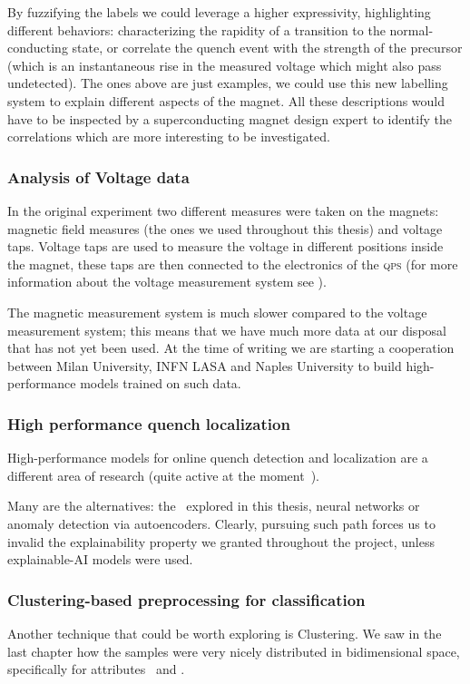 By fuzzifying the labels we could leverage a higher expressivity, highlighting different
behaviors: characterizing the rapidity of a transition to the normal-conducting state, or correlate
the quench event with the strength of the precursor (which is an instantaneous rise in the measured
voltage which might also pass undetected). The ones above are just examples, we could use this new labelling system to explain
different aspects of the magnet. All these descriptions would have to be inspected by a
superconducting magnet design expert to identify the correlations which are more interesting to be
investigated.

\subsubsection{Analysis of Voltage data}
In the original experiment two different measures were taken on the magnets: magnetic field measures (the
ones we used throughout this thesis) and voltage taps. Voltage taps are used to measure the voltage
in different positions inside the magnet, these taps are then connected to the electronics of the
\textsc{qps} (for more information about the voltage measurement system see ).

The magnetic measurement system is much slower compared to the voltage measurement system; this
means that we have much more data at our disposal that has not yet been used. At the time of writing
we are starting a cooperation between Milan University, INFN LASA and Naples University to build
high-performance models trained on such data.

\subsubsection{High performance quench localization}
High-performance models for online quench detection and localization are a different area of
research (quite active at the moment~\cite{hoang2021, zhou2021, einstein2023}).

Many are the alternatives: the \svcs\ explored in this thesis, neural networks or anomaly detection
via autoencoders. Clearly, pursuing such path forces us to invalid the explainability property we
granted throughout the project, unless explainable-AI models were used.

\subsubsection{Clustering-based preprocessing for classification}
Another technique that could be worth exploring is Clustering. We saw in the last chapter how the
samples were very nicely distributed in bidimensional space, specifically for attributes \an\ and
\cnmod.

